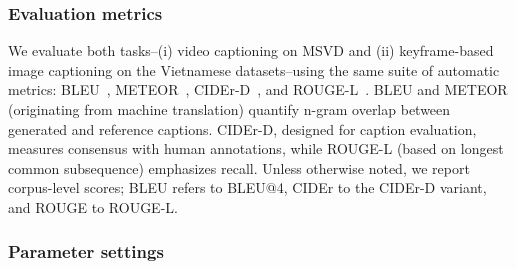 \subsubsection{Evaluation metrics}


We evaluate both tasks--(i) video captioning on MSVD and (ii) keyframe-based image captioning on the Vietnamese datasets--using the same suite of automatic metrics: BLEU~\cite{papineni-etal-2002-bleu}, METEOR~\cite{banerjee-lavie-2005-meteor}, CIDEr\mbox{-}D~\cite{vedantam2015cider}, and ROUGE\mbox{-}L~\cite{lin-2004-rouge}. 
BLEU and METEOR (originating from machine translation) quantify n\mbox{-}gram overlap between generated and reference captions. 
CIDEr\mbox{-}D, designed for caption evaluation, measures consensus with human annotations, while ROUGE\mbox{-}L (based on longest common subsequence) emphasizes recall. 
Unless otherwise noted, we report corpus\mbox{-}level scores; BLEU refers to BLEU@4, CIDEr to the CIDEr\mbox{-}D variant, and ROUGE to ROUGE\mbox{-}L.


\subsubsection{Parameter settings}


